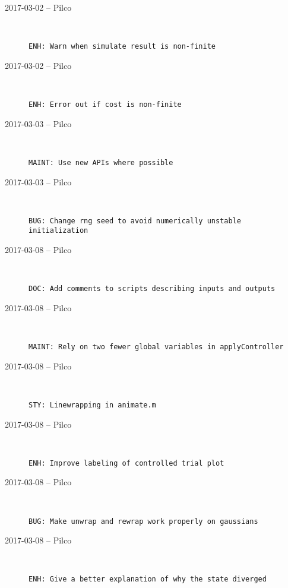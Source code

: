 \begin{description}
  \item[2017-03-02 -- Pilco] \hfill \
\begin{lstlisting}
ENH: Warn when simulate result is non-finite
\end{lstlisting}


  \item[2017-03-02 -- Pilco] \hfill \
\begin{lstlisting}
ENH: Error out if cost is non-finite
\end{lstlisting}


  \item[2017-03-03 -- Pilco] \hfill \
\begin{lstlisting}
MAINT: Use new APIs where possible
\end{lstlisting}


  \item[2017-03-03 -- Pilco] \hfill \
\begin{lstlisting}
BUG: Change rng seed to avoid numerically unstable initialization
\end{lstlisting}


  \item[2017-03-08 -- Pilco] \hfill \
\begin{lstlisting}
DOC: Add comments to scripts describing inputs and outputs
\end{lstlisting}


  \item[2017-03-08 -- Pilco] \hfill \
\begin{lstlisting}
MAINT: Rely on two fewer global variables in applyController
\end{lstlisting}


  \item[2017-03-08 -- Pilco] \hfill \
\begin{lstlisting}
STY: Linewrapping in animate.m
\end{lstlisting}


  \item[2017-03-08 -- Pilco] \hfill \
\begin{lstlisting}
ENH: Improve labeling of controlled trial plot
\end{lstlisting}


  \item[2017-03-08 -- Pilco] \hfill \
\begin{lstlisting}
BUG: Make unwrap and rewrap work properly on gaussians
\end{lstlisting}


  \item[2017-03-08 -- Pilco] \hfill \
\begin{lstlisting}
ENH: Give a better explanation of why the state diverged
\end{lstlisting}



\end{description}
